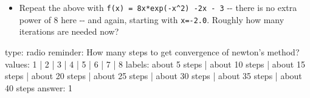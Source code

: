 \documentclass[12pt]{article}
\begin{document}
\begin{itemize}
\itemsep1pt\parskip0pt
\item
  Repeat the above with \texttt{f(x) = 8x*exp(-x\^{}2) -2x - 3} -{}-
  there is no extra power of $8$ here -{}- and again, starting with
  \texttt{x=-2.0}. Roughly how many iterations are needed now?
\end{itemize}

\begin{answer}
type: radio
reminder: How many steps to get convergence of newton's method?
values: 1 | 2 | 3 | 4 | 5 | 6 | 7 | 8
labels: about 5 steps | about 10 steps | about 15 steps | about 20 steps | about 25 steps | about 30 steps | about 35 steps | about 40 steps
answer: 1
\end{answer}
\end{document}
